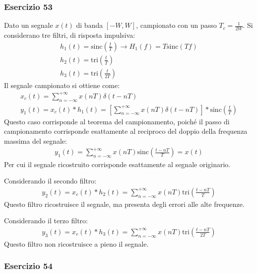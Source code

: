 \documentclass{article}
\newcommand{\sinc}{\mathrm{sinc}}
\newcommand{\tri}{\mathrm{tri}}
\begin{document}
\subsubsection*{Esercizio 53}

Dato un segnale $x(t)$ di banda $[-W,W]$, campionato con un passo $T_c=\displaystyle\frac{1}{2W}$. Si considerano tre filtri, di risposta impulsiva:
\begin{gather*}
    h_1(t)=\sinc\left(\displaystyle\frac{t}{T}\right)\to H_1(f)=T\sinc(Tf)\\
    h_2(t)=\tri \left(\displaystyle\frac{t}{T}\right)\\
    h_3(t)=\tri \left(\displaystyle\frac{t}{2T}\right)
\end{gather*}
Il segnale campionato si ottiene come:
\begin{gather*}
    x_c(t)=\displaystyle\sum_{n=-\infty}^{+\infty}x(nT)\delta(t-nT)\\
    y_1(t)=x_c(t)*h_1(t)=\left[\displaystyle\sum_{n=-\infty}^{+\infty}x(nT)\delta(t-nT)\right]*\sinc\left(\frac{t}{T}\right)
\end{gather*}
Questo caso corrisponde al teorema del campionamento, poiché il passo di campionamento corrisponde esattamente al reciproco del doppio della frequenza massima del segnale:
\begin{gather}
    y_1(t)=\displaystyle\sum_{n=-\infty}^{+\infty}x(nT)\sinc\left(\frac{t-nT}{T}\right)=x(t)
\end{gather}
Per cui il segnale ricostruito corrisponde esattamente al segnale originario. 

Considerando il secondo filtro:
\begin{gather}
    y_2(t)=x_c(t)*h_2(t)=\displaystyle\sum_{n=-\infty}^{+\infty}x(nT)\tri \left(\frac{t-nT}{T}\right)
\end{gather}
Questo filtro ricostruisce il segnale, ma presenta degli errori alle alte frequenze. 

Considerando il terzo filtro:
\begin{gather}
    y_3(t)=x_c(t)*h_3(t)=\displaystyle\sum_{n=-\infty}^{+\infty}x(nT)\tri \left(\frac{t-nT}{2T}\right)
\end{gather}
Questo filtro non ricostruisce a pieno il segnale. 

\subsubsection*{Esercizio 54}
\end{document}
